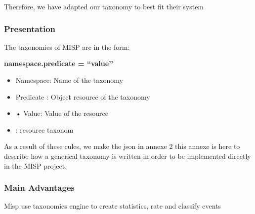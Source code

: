 \documentclass[12pt]{report}
\begin{document}
Therefore, we have adapted our taxonomy to best fit their system\par


\vspace{\baselineskip}
\subsubsection*{Presentation}

\vspace{\baselineskip}
The taxonomies of MISP are in the form:\par

\begin{Center}
{\fontsize{16pt}{19.2pt}\selectfont \textbf{ namespace.predicate = ``value’’}\par}
\end{Center}\par

\begin{itemize}
	\item Namespace\tab : Name of the taxonomy\par
	\item Predicate \tab : Object resource of the taxonomy\par
    \item •	Value\tab : Value of the resource\par
	\item  \tab :  resource  taxonom\par
\end{itemize}\par

As a result of these rules, we make the json in annexe 2 this annexe is here to describe how a generical taxonomy is written in order to be implemented directly in the MISP project.  \par

\subsubsection*{Main Advantages}
Misp use taxonomies engine to create statistics, rate and classify events \par


\vspace{\baselineskip}
\end{document}
